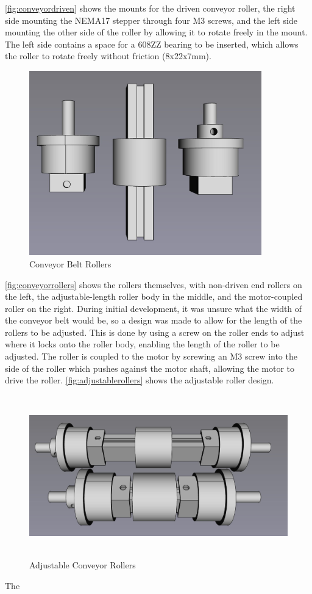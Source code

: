 \autoref{fig:conveyordriven} shows the mounts for the driven conveyor roller, the right side mounting the NEMA17 stepper through four M3 screws, and the left side mounting the other side of the roller by allowing it to rotate freely in the mount. The left side contains a space for a 608ZZ bearing to be inserted, which allows the roller to rotate freely without friction (8x22x7mm). 

\begin{figure}[H]
    \begin{minipage}[h]{0.95\textwidth}
        \centering
        \includegraphics[height=8cm]{imgs/freecad/rollers.jpg}
        \caption{Conveyor Belt Rollers}
        \label{fig:conveyorrollers}
    \end{minipage}
\end{figure}

\autoref{fig:conveyorrollers} shows the rollers themselves, with non-driven end rollers on the left, the adjustable-length roller body in the middle, and the motor-coupled roller on the right. During initial development, it was unsure what the width of the conveyor belt would be, so a design was made to allow for the length of the rollers to be adjusted. This is done by using a screw on the roller ends to adjust where it locks onto the roller body, enabling the length of the roller to be adjusted. The roller is coupled to the motor by screwing an M3 screw into the side of the roller which pushes against the motor shaft, allowing the motor to drive the roller. \autoref{fig:adjustablerollers} shows the adjustable roller design.

\begin{figure}[H]
    \begin{minipage}[h]{0.95\textwidth}
        \centering
        \includegraphics[height=7cm]{imgs/freecad/adjustablerollers.jpg}
        \caption{Adjustable Conveyor Rollers}
        \label{fig:adjustablerollers}
    \end{minipage}
\end{figure}

The 